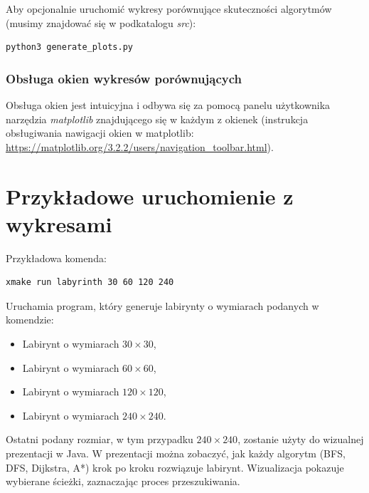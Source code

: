 \documentclass{article}
\begin{document}
Aby opcjonalnie uruchomić wykresy porównujące skuteczności algorytmów (musimy znajdować się w podkatalogu \textit{src}):

\begin{lstlisting}
python3 generate_plots.py
\end{lstlisting}

\subsubsection{Obsługa okien wykresów porównujących}

Obsługa okien jest intuicyjna i odbywa się za pomocą panelu użytkownika narzędzia \textit{matplotlib} znajdującego się w każdym z okienek (instrukcja obsługiwania nawigacji okien w matplotlib: \\ \url{https://matplotlib.org/3.2.2/users/navigation_toolbar.html}).

\section{Przykładowe uruchomienie z wykresami}

Przykładowa komenda:
\begin{lstlisting}[caption=Uruchamianie programu z różnymi rozmiarami labiryntów]
xmake run labyrinth 30 60 120 240
\end{lstlisting}

Uruchamia program, który generuje labirynty o wymiarach podanych w komendzie:
\begin{itemize}
    \item Labirynt o wymiarach $30 \times 30$,
    \item Labirynt o wymiarach $60 \times 60$,
    \item Labirynt o wymiarach $120 \times 120$,
    \item Labirynt o wymiarach $240 \times 240$.
\end{itemize}

Ostatni podany rozmiar, w tym przypadku $240 \times 240$, zostanie użyty do wizualnej prezentacji w Java. W prezentacji można zobaczyć, jak każdy algorytm (BFS, DFS, Dijkstra, A*) krok po kroku rozwiązuje labirynt. Wizualizacja pokazuje wybierane ścieżki, zaznaczając proces przeszukiwania.
\end{document}
